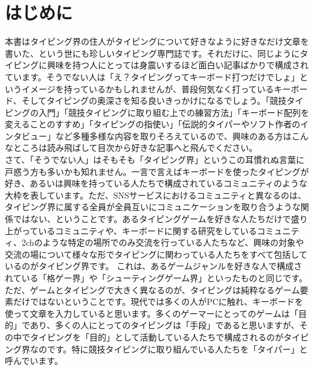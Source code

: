 \onecolumn
\part*{はじめに}

本書はタイピング界の住人がタイピングについて好きなように好きなだけ文章を書いた、という世にも珍しいタイピング専門誌です。それだけに、同じようにタイピングに興味を持つ人にとっては身震いするほど面白い記事ばかりで構成されています。そうでない人は「え？タイピングってキーボード打つだけでしょ」というイメージを持っているかもしれませんが、普段何気なく打っているキーボード、そしてタイピングの奥深さを知る良いきっかけになるでしょう。「競技タイピングの入門」「競技タイピングに取り組む上での練習方法」「キーボード配列を変えることのすすめ」「タイピングの指使い」「伝説的タイパーやソフト作者のインタビュー」など多種多様な内容を取りそろえているので、興味のある方はこんなところは読み飛ばして目次から好きな記事へと飛んでください。\\

さて、「そうでない人」はそもそも「タイピング界」というこの耳慣れぬ言葉に戸惑う方も多いかも知れません。一言で言えばキーボードを使ったタイピングが好き、あるいは興味を持っている人たちで構成されているコミュニティのような大枠を表しています。ただ、SNSサービスにおけるコミュニティと異なるのは、タイピング界に属する全員が全員互いにコミュニケーションを取り合うような関係ではない、ということです。あるタイピングゲームを好きな人たちだけで盛り上がっているコミュニティや、キーボードに関する研究をしているコミュニティ、2chのような特定の場所でのみ交流を行っている人たちなど、興味の対象や交流の場について様々な形でタイピングに関わっている人たちをすべて包括しているのがタイピング界です。
これは、あるゲームジャンルを好きな人で構成されている「格ゲー界」や「シューティングゲーム界」といったものと同じです。ただ、ゲームとタイピングで大きく異なるのが、タイピングは純粋なるゲーム要素だけではないということです。現代では多くの人がPCに触れ、キーボードを使って文章を入力していると思います。多くのゲーマーにとってのゲームは「目的」であり、多くの人にとってのタイピングは「手段」であると思いますが、その中でタイピングを「目的」として活動している人たちで構成されるのがタイピング界なのです。特に競技タイピングに取り組んでいる人たちを「タイパー」と呼んでいます。

